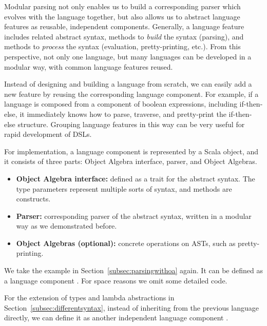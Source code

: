 Modular parsing not only enables us to build a corresponding parser
which evolves with the language together, but also allows us to
abstract language features as reusable, independent components.
Generally, a language feature includes related abstract syntax,
methods to \textit{build} the syntax (parsing), and methods to
\textit{process} the syntax (evaluation, pretty-printing, etc.). From
this perspective, not only one language, but many languages can be
developed in a modular way, with common language features reused.

Instead of designing and building a language from scratch, we can
easily add a new feature by reusing the corresponding language
component. For example, if a language is composed from a component of
boolean expressions, including if-then-else, it immediately knows how
to parse, traverse, and pretty-print the if-then-else structure.
Grouping language features in this way can
be very useful for rapid development of DSLs.

For implementation, a language component is represented by a Scala object, and it consists of three parts: Object Algebra interface, parser, and Object Algebras.

\begin{itemize}[leftmargin=*]
    \item \textbf{Object Algebra interface:} defined as a trait for the abstract syntax. The type parameters represent multiple sorts of syntax, and  methods are constructs.
    \item \textbf{Parser:} corresponding parser of the abstract syntax, written in a modular way as we demonstrated before.
    \item \textbf{Object Algebras (optional):} concrete operations on ASTs, such as pretty-printing.
\end{itemize}

We take the example in Section~\ref{subsec:parsingwithoa} again. It can be defined as a language component .
For space reasons we omit some detailed code.

\vspace{-4pt}
\vspace{-4pt}

For the extension of types and lambda abstractions in Section~\ref{subsec:differentsyntax}, instead of inheriting from the previous language directly, we can define it as another independent language component .

